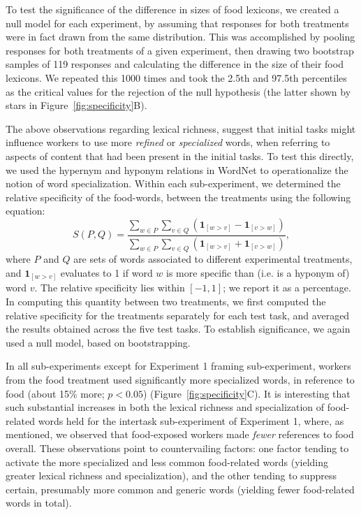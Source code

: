 \documentclass{sigchi}
\begin{document}
To test the significance of the difference in sizes of food
lexicons,
we created a null model for each experiment, by assuming that
responses for both treatments were in fact drawn from the same 
distribution.
This was accomplished by pooling responses for both treatments 
of a given experiment, then 
drawing two bootstrap samples of 119 responses and calculating
the difference in the size of their food lexicons.  
We repeated this 1000 times and took the 2.5th and 97.5th percentiles 
as the critical values for the rejection of the null hypothesis 
(the latter shown by stars in Figure~\ref{fig:specificity}B).

The above observations regarding lexical richness, suggest that initial 
tasks might influence workers to use more \textit{refined} or 
\textit{specialized} words, when referring to aspects 
of content that had been present in the initial tasks.  
To test this directly, we used the hypernym and hyponym relations in 
WordNet to operationalize the notion of word specialization.  
Within each sub-experiment, we determined the relative specificity
of the food-words, between the treatments using the following equation:
\begin{equation}
	S(P,Q) = \frac{
		\sum_{w\in P}\sum_{v\in Q} \left(
			\mathbf{1}_{[w>v]} - \mathbf{1}_{[v>w]} \right)
	}{
		\sum_{w\in P}\sum_{v\in Q} \left(
			\mathbf{1}_{[w>v]} + \mathbf{1}_{[v>w]} \right)
	},
\end{equation}
where $P$ and $Q$ are sets of words associated to different experimental 
treatments, and $\mathbf{1}_{[w>v]}$ evaluates
to 1 if word $w$ is more specific than (i.e. is a hyponym of) word $v$.
The relative specificity lies within $[-1,1]$; 
we report it as a percentage.
In computing this quantity between two treatments, we first computed the 
relative specificity for the treatments separately for each test task, and 
averaged the results obtained across the five test tasks.  To establish
significance, we again used a null model, based on bootstrapping.

In all sub-experiments except for Experiment 1 framing sub-experiment, 
workers from the food treatment used significantly more specialized words, 
in reference to food 
(about 15\% more; $p < 0.05$) (Figure~\ref{fig:specificity}C).
It is interesting that such substantial increases in both the lexical 
richness and specialization of food-related words 
held for the intertask sub-experiment of Experiment 1, where, as mentioned,
we observed 
that food-exposed workers made \textit{fewer} references to food overall. 
These observations point 
to countervailing factors: one factor tending to activate the more 
specialized and less common food-related words 
(yielding greater lexical richness and specialization), and the other tending 
to suppress certain, presumably more common and generic words 
(yielding fewer food-related words in total).
\end{document}
